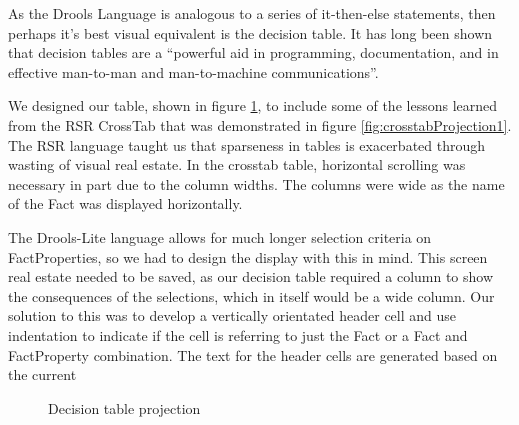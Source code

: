As the Drools Language is analogous to a series of it-then-else statements, then perhaps it's best visual equivalent is the decision table.
It has long been shown that decision tables are a ``powerful aid in programming, documentation, and in effective man-to-man and man-to-machine communications''\cite{pooch1974translation}.

We designed our table, shown in figure \ref{fig:decisionTableProjection}, to include some of the lessons learned from the RSR CrossTab that was demonstrated in figure \ref{fig:crosstabProjection1}.
The RSR language taught us that sparseness in tables is exacerbated through wasting of visual real estate.
In the crosstab table, horizontal scrolling was necessary in part due to the column widths.
The columns were wide as the name of the Fact was displayed horizontally.

The Drools-Lite language allows for much longer selection criteria on FactProperties, so we had to design the display with this in mind.
This screen real estate needed to be saved, as our decision table required a column to show the consequences of the selections, which in itself would be a wide column.
Our solution to this was to develop a vertically orientated header cell and use indentation to indicate if the cell is referring to just the Fact or a Fact and FactProperty combination.
The text for the header cells are generated based on the current


\begin{figure}[h]
    \centering
    \caption{Decision table projection}
    \label{fig:decisionTableProjection}
\end{figure}

